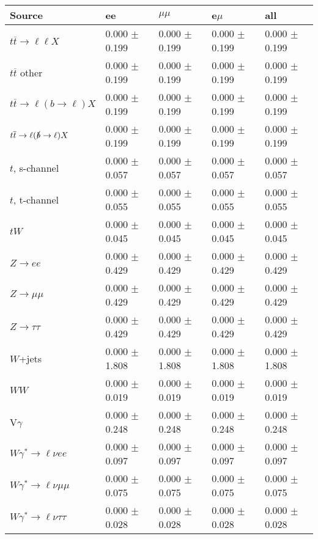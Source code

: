 \begin{tabular}{l | l l l l}
\hline\hline
 Source  &  ee  &  $\mu\mu$  &  e$\mu$  &  all \\
\hline
$t\overline{t}\rightarrow \ell\ell X$ &  0.000 $\pm$  0.199 &  0.000 $\pm$  0.199 &  0.000 $\pm$  0.199 &  0.000 $\pm$  0.199\\
$t\overline{t}$ other &  0.000 $\pm$  0.199 &  0.000 $\pm$  0.199 &  0.000 $\pm$  0.199 &  0.000 $\pm$  0.199\\
$t\overline{t}\rightarrow \ell(b\rightarrow \ell)X$ &  0.000 $\pm$  0.199 &  0.000 $\pm$  0.199 &  0.000 $\pm$  0.199 &  0.000 $\pm$  0.199\\
$t\overline{t}\rightarrow \ell(\slashed{b}\rightarrow \ell)X$ &  0.000 $\pm$  0.199 &  0.000 $\pm$  0.199 &  0.000 $\pm$  0.199 &  0.000 $\pm$  0.199\\
\hline
$t$, s-channel &  0.000 $\pm$  0.057 &  0.000 $\pm$  0.057 &  0.000 $\pm$  0.057 &  0.000 $\pm$  0.057\\
$t$, t-channel &  0.000 $\pm$  0.055 &  0.000 $\pm$  0.055 &  0.000 $\pm$  0.055 &  0.000 $\pm$  0.055\\
$tW$ &  0.000 $\pm$  0.045 &  0.000 $\pm$  0.045 &  0.000 $\pm$  0.045 &  0.000 $\pm$  0.045\\
\hline
$Z\rightarrow ee$ &  0.000 $\pm$  0.429 &  0.000 $\pm$  0.429 &  0.000 $\pm$  0.429 &  0.000 $\pm$  0.429\\
$Z\rightarrow\mu\mu$ &  0.000 $\pm$  0.429 &  0.000 $\pm$  0.429 &  0.000 $\pm$  0.429 &  0.000 $\pm$  0.429\\
$Z\rightarrow\tau\tau$ &  0.000 $\pm$  0.429 &  0.000 $\pm$  0.429 &  0.000 $\pm$  0.429 &  0.000 $\pm$  0.429\\
$W$+jets &  0.000 $\pm$  1.808 &  0.000 $\pm$  1.808 &  0.000 $\pm$  1.808 &  0.000 $\pm$  1.808\\
$WW$ &  0.000 $\pm$  0.019 &  0.000 $\pm$  0.019 &  0.000 $\pm$  0.019 &  0.000 $\pm$  0.019\\
\hline
V$\gamma$ &  0.000 $\pm$  0.248 &  0.000 $\pm$  0.248 &  0.000 $\pm$  0.248 &  0.000 $\pm$  0.248\\
$W\gamma^{*}\rightarrow\ell\nu e e$ &  0.000 $\pm$  0.097 &  0.000 $\pm$  0.097 &  0.000 $\pm$  0.097 &  0.000 $\pm$  0.097\\
$W\gamma^{*}\rightarrow\ell\nu\mu\mu$ &  0.000 $\pm$  0.075 &  0.000 $\pm$  0.075 &  0.000 $\pm$  0.075 &  0.000 $\pm$  0.075\\
$W\gamma^{*}\rightarrow\ell\nu\tau\tau$ &  0.000 $\pm$  0.028 &  0.000 $\pm$  0.028 &  0.000 $\pm$  0.028 &  0.000 $\pm$  0.028\\

\end{tabular}
